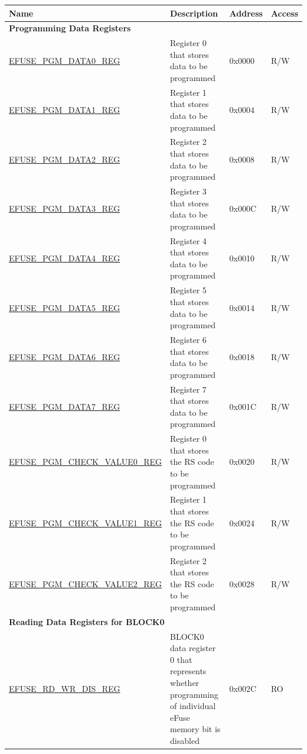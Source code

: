 \begin{longtable}{ | p{7cm} | p{7.2cm} | p{1.3cm} | p{1cm} | }
\hline\rowcolor{lightgray}
\textbf{Name} & \textbf{Description} &  \textbf{Address} & \textbf{Access} \\ \hline
\endhead
\multicolumn{4}{|l|}{\textbf{Programming Data Registers}} \\ \hline
\hyperref[regdesc:EFUSEPGMDATANREG]{EFUSE\_PGM\_DATA0\_REG} & Register 0 that stores data to be programmed & 0x0000 & R/W \\ \hline
\hyperref[regdesc:EFUSEPGMDATANREG]{EFUSE\_PGM\_DATA1\_REG} & Register 1 that stores data to be programmed & 0x0004 & R/W \\ \hline
\hyperref[regdesc:EFUSEPGMDATANREG]{EFUSE\_PGM\_DATA2\_REG} & Register 2 that stores data to be programmed & 0x0008 & R/W \\ \hline
\hyperref[regdesc:EFUSEPGMDATANREG]{EFUSE\_PGM\_DATA3\_REG} & Register 3 that stores data to be programmed & 0x000C & R/W \\ \hline
\hyperref[regdesc:EFUSEPGMDATANREG]{EFUSE\_PGM\_DATA4\_REG} & Register 4 that stores data to be programmed & 0x0010 & R/W \\ \hline
\hyperref[regdesc:EFUSEPGMDATANREG]{EFUSE\_PGM\_DATA5\_REG} & Register 5 that stores data to be programmed & 0x0014 & R/W \\ \hline
\hyperref[regdesc:EFUSEPGMDATANREG]{EFUSE\_PGM\_DATA6\_REG} & Register 6 that stores data to be programmed & 0x0018 & R/W \\ \hline
\hyperref[regdesc:EFUSEPGMDATANREG]{EFUSE\_PGM\_DATA7\_REG} & Register 7 that stores data to be programmed & 0x001C & R/W \\ \hline
\hyperref[regdesc:EFUSEPGMCHECKVALUEMREG]{EFUSE\_PGM\_CHECK\_VALUE0\_REG} & Register 0 that stores the RS code to be programmed & 0x0020 & R/W \\ \hline
\hyperref[regdesc:EFUSEPGMCHECKVALUEMREG]{EFUSE\_PGM\_CHECK\_VALUE1\_REG} & Register 1 that stores the RS code to be programmed & 0x0024 & R/W \\ \hline
\hyperref[regdesc:EFUSEPGMCHECKVALUEMREG]{EFUSE\_PGM\_CHECK\_VALUE2\_REG} & Register 2 that stores the RS code to be programmed & 0x0028 & R/W \\ \hline
\multicolumn{4}{|l|}{\textbf{Reading Data Registers for BLOCK0}} \\ \hline
\hyperref[regdesc:EFUSERDWRDISREG]{EFUSE\_RD\_WR\_DIS\_REG} & BLOCK0 data register 0 that represents whether programming of individual eFuse memory bit is disabled & 0x002C & RO \\ \hline

\end{longtable}
